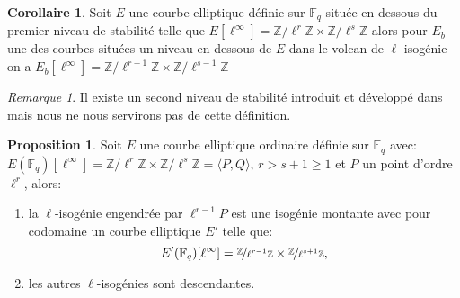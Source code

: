 \documentclass[10pt,a4paper]{book}
\theoremstyle{plain}
\theoremstyle{definition}
\theoremstyle{definition}
\newtheorem{cor}[thm]{Corollaire}
\theoremstyle{definition}
\newtheorem{prop}[thm]{Proposition}
\theoremstyle{definition}
\theoremstyle{remark}
\newtheorem{rem}[thm]{Remarque}
\theoremstyle{remark}
\theoremstyle{definition}
\begin{document}
\begin{cor}
\label{cor:des:str}
Soit $E$ une courbe elliptique définie sur $\mathbb{F}_q$ située en dessous du premier niveau de stabilité telle que $E[\ell^{\infty}]=\mathbb{Z}/\ell^r\mathbb{Z} \times \mathbb{Z}/\ell^s\mathbb{Z}$ alors pour $E_b$ une des courbes situées un niveau en dessous de $E$ dans le volcan de $\ell$-isogénie on a $E_b[\ell^{\infty}]=\mathbb{Z}/\ell^{r+1}\mathbb{Z} \times \mathbb{Z}/\ell^{s-1}\mathbb{Z}$
\end{cor}

\begin{rem}
Il existe un second niveau de stabilité introduit et développé dans 
\cite{Ionica-Joux10} mais nous ne nous servirons pas de cette définition.
\end{rem}

\begin{prop} 
\label{pro:iso:mon}
Soit $E$ une courbe elliptique ordinaire définie sur $\mathbb{F}_q$ avec: $E(\mathbb{F}_q)[\ell^{\infty}]=\mathbb{Z}/\ell^{r}\mathbb{Z} \times \mathbb{Z}/\ell^{s}\mathbb{Z}= \langle P,Q \rangle $, $r>s +1 \geqslant  1$ et $P$ un point d'ordre $\ell^r$, alors:
\begin{enumerate}
\item la $\ell$-isogénie engendrée par $\ell^{r-1}P$ est une isogénie montante avec pour codomaine un courbe elliptique $E'$ telle que: \[E'(\mathbb{F}_q)[\ell^{\infty}]=\nicefrac{\mathbb{Z}}{\ell^{r-1}\mathbb{Z}} \times \nicefrac{\mathbb{Z}}{\ell^{s+1}\mathbb{Z}}, \]
\item les autres $\ell$-isogénies sont descendantes.
\end{enumerate}
\end{prop}
\end{document}
